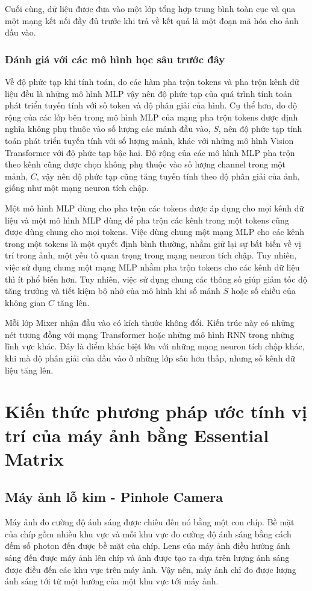 Cuối cùng, dữ liệu được đưa vào một lớp tổng hợp trung bình toàn cục và qua một mạng kết nối đầy đủ trước khi trả về kết quả là một đoạn mã hóa cho ảnh đầu vào.

\subsubsection*{Đánh giá với các mô hình học sâu trước đây}
Về độ phức tạp khi tính toán, do các hàm pha trộn tokens và pha trộn kênh dữ liệu đều là những mô hình MLP vậy nên độ phức tạp của quá trình tính toán phát triển tuyến tính với số token và độ phân giải của hình. Cụ thể hơn, do độ rộng của các lớp bên trong mô hình MLP của mạng pha trộn tokens được định nghĩa không phụ thuộc vào số lượng các mảnh đầu vào, $S$, nên độ phức tạp tính toán phát triển tuyến tính với số lượng mảnh, khác với những mô hình Vision Transformer với độ phức tạp bậc hai. Độ rộng của các mô hình MLP pha trộn theo kênh cũng được chọn không phụ thuộc vào số lượng channel trong một mảnh, $C$, vậy nên độ phức tạp cũng tăng tuyến tính theo độ phân giải của ảnh, giống như một mạng neuron tích chập.

Một mô hình MLP dùng cho pha trộn các tokens được áp dụng cho mọi kênh dữ liệu và một mô hình MLP dùng để pha trộn các kênh trong một tokens cũng được dùng chung cho mọi tokens. Việc dùng chung một mạng MLP cho các kênh trong một tokens là một quyết định bình thường, nhằm giữ lại sự bất biến về vị trí trong ảnh, một yếu tố quan trọng trong mạng neuron tích chập. Tuy nhiên, việc sử dụng chung một mạng MLP nhằm pha trộn tokens cho các kênh dữ liệu thì ít phổ biến hơn. Tuy nhiên, việc sử dụng chung các thông số giúp giảm tốc độ tăng trưởng và tiết kiệm bộ nhớ của mô hình khi số mảnh $S$ hoặc số chiều của không gian $C$ tăng lên.

Mỗi lớp Mixer nhận đầu vào có kích thước không đổi. Kiến trúc này có những nét tương đồng với mạng Transformer hoặc những mô hình RNN trong những lĩnh vực khác. Đây là điểm khác biệt lớn với những mạng neuron tích chập khác, khi mà độ phân giải của đầu vào ở những lớp sâu hơn thấp, nhưng số kênh dữ liệu tăng lên.


\section{Kiến thức phương pháp ước tính vị trí của máy ảnh bằng Essential Matrix}
\subsection{Máy ảnh lỗ kim - Pinhole Camera}
Máy ảnh đo cường độ ánh sáng được chiếu đến nó bằng một con chíp. Bề mặt của chíp gồm nhiều khu vực và mỗi khu vực đo cường độ ánh sáng bằng cách đếm số photon đến được bề mặt của chíp. Lens của máy ảnh điều hướng ánh sáng đến được máy ảnh lên chíp và ảnh được tạo ra dựa trên lượng ánh sáng được điều đến các khu vực trên máy ảnh. Vậy nên, máy ảnh chỉ đo được lượng ánh sáng tới từ một hướng của một khu vực tới máy ảnh.


